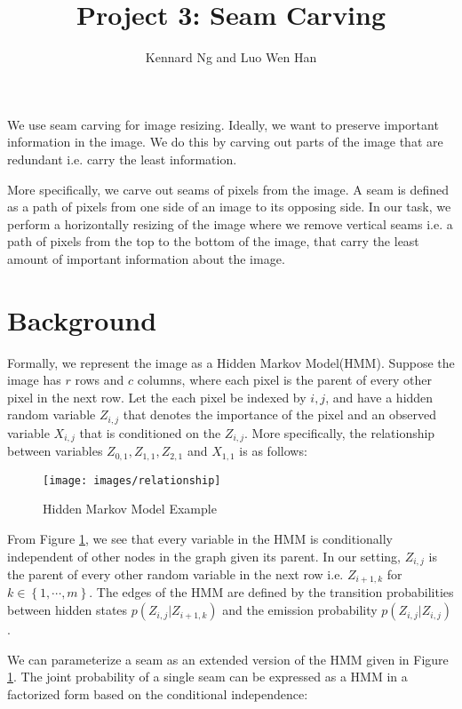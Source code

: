\documentclass[a4paper]{article}
\author{Kennard Ng and Luo Wen Han}
\title{Project 3: Seam Carving}
\begin{document}
	\maketitle
	
	We use seam carving for image resizing. Ideally, we want to preserve important information in the image. We do this by carving out parts of the image that are redundant i.e. carry the least information. 
	
	More specifically, we carve out seams of pixels from the image. A seam is defined as a path of pixels from one side of an image to its opposing side. In our task, we perform a horizontally resizing of the image where we remove vertical seams i.e. a path of pixels from the top to the bottom of the image, that carry the least amount of important information about the image. 
	
	\section{Background}
	
	Formally, we represent the image as a Hidden Markov Model(HMM). Suppose the image has $r$ rows and $c$ columns, where each pixel is the parent of every other pixel in the next row. Let the each pixel be indexed by $i,j$, and have a hidden random variable $Z_{i,j}$ that denotes the importance of the pixel and  an observed variable $X_{i,j}$ that is conditioned on the $Z_{i,j}$. More specifically, the relationship between variables $Z_{0,1}, Z_{1,1}, Z_{2,1}$ and $X_{1,1}$ is as follows: 
	\begin{figure}[ht]
		\centering
		\texttt{[image: images/relationship]}
		\caption{Hidden Markov Model Example}
		\label{fig:relationship}
	\end{figure}
	
	From Figure \ref{fig:relationship}, we see that every variable in the HMM is conditionally independent of other nodes in the graph given its parent. In our setting, $Z_{i,j}$ is the parent of every other random variable in the next row i.e. $Z_{i+1,k}$ for $k \in \left\{1, \cdots, m\right\}$. The edges of the HMM are defined by the transition probabilities between hidden states $p(Z_{i,j}|Z_{i+1,k})$ and the emission probability $p(Z_{i,j}|Z_{i,j})$.
	
	We can parameterize a seam as an extended version of the HMM given in Figure \ref{fig:relationship}. The joint probability of a single seam can be expressed as a HMM in a factorized form based on the conditional independence: 
	
\end{document}
